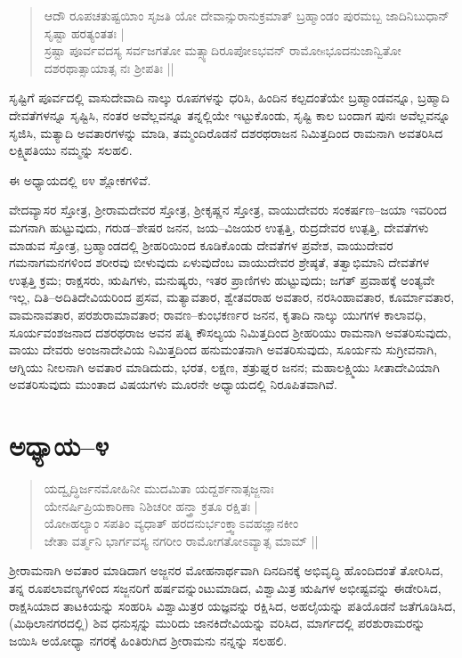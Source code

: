 \begin{verse}
ಆದೌ ರೂಪಚತುಷ್ಟಯಿಾಂ ಸೃಜತಿ ಯೋ ದೇವಾನ್ಸುರಾನುಕ್ರಮಾತ್ ಬ್ರಹ್ಮಾಂಡಂ ಪುರಮಬ್ಬ ಜಾದಿನಿಬುಧಾನ್ ಸೃಷ್ಟಾ ಹರತ್ಯಂತತಃ |\\ ಸ್ರಷ್ಟಾ ಪೂರ್ವವದಸ್ಯ ಸರ್ವಜಗತೋ ಮತ್ಸ್ಯಾದಿರೂಪೋಽಭವನ್ ರಾಮೋsಭೂದನುಜಾನ್ವಿತೋ ದಶರಥಾತ್ಸಾಯಾತ್ಸ ನಃ ಶ‍್ರೀಪತಿಃ ||
\end{verse}

ಸೃಷ್ಟಿಗೆ ಪೂರ್ವದಲ್ಲಿ ವಾಸುದೇವಾದಿ ನಾಲ್ಕು ರೂಪಗಳನ್ನು ಧರಿಸಿ, ಹಿಂದಿನ ಕಲ್ಪದಂತೆಯೇ ಬ್ರಹ್ಮಾಂಡವನ್ನೂ, ಬ್ರಹ್ಮಾದಿ ದೇವತೆಗಳನ್ನೂ ಸೃಷ್ಟಿಸಿ, ನಂತರ ಅವೆಲ್ಲವನ್ನೂ ತನ್ನಲ್ಲಿಯೇ ಇಟ್ಟುಕೊಂಡು, ಸೃಷ್ಟಿ ಕಾಲ ಬಂದಾಗ ಪುನಃ ಅವೆಲ್ಲವನ್ನೂ ಸೃಜಿಸಿ, ಮತ್ಯಾದಿ ಅವತಾರಗಳನ್ನು ಮಾಡಿ, ತಮ್ಮಂದಿರೊಡನೆ ದಶರಥರಾಜನ ನಿಮಿತ್ತದಿಂದ ರಾಮನಾಗಿ ಅವತರಿಸಿದ ಲಕ್ಷ್ಮಿಪತಿಯು ನಮ್ಮನ್ನು ಸಲಹಲಿ.

ಈ ಅಧ್ಯಾಯದಲ್ಲಿ ೮೪ ಶ್ಲೋಕಗಳಿವೆ.

ವೇದವ್ಯಾಸರ ಸ್ತೋತ್ರ, ಶ‍್ರೀರಾಮದೇವರ ಸ್ತೋತ್ರ, ಶ‍್ರೀಕೃಷ್ಣನ ಸ್ತೋತ್ರ, ವಾಯುದೇವರು ಸಂಕರ್ಷಣ–ಜಯಾ ಇವರಿಂದ ಮಗನಾಗಿ ಹುಟ್ಟುವುದು, ಗರುಡ–ಶೇಷರ ಜನನ, ಜಯ–ವಿಜಯರ ಉತ್ಪತ್ತಿ, ರುದ್ರದೇವರ ಉತ್ಪತ್ತಿ, ದೇವತೆಗಳು ಮಾಡುವ ಸ್ತೋತ್ರ, ಬ್ರಹ್ಮಾಂಡದಲ್ಲಿ ಶ‍್ರೀಹರಿಯಿಂದ ಕೂಡಿಕೊಂಡು ದೇವತೆಗಳ ಪ್ರವೇಶ, ವಾಯುದೇವರ ಗಮನಾಗಮನಗಳಿಂದ ಶರೀರವು ಬೀಳುವುದು ಏಳುವುದೆಂಬ ವಾಯುದೇವರ ಶ್ರೇಷ್ಠತೆ, ತತ್ವಾಭಿಮಾನಿ ದೇವತೆಗಳ ಉತ್ಪತ್ತಿ ಕ್ರಮ; ರಾಕ್ಷಸರು, ಋಷಿಗಳು, ಮನುಷ್ಯರು, ಇತರ ಪ್ರಾಣಿಗಳು ಹುಟ್ಟುವುದು; ಜಗತ್ ಪ್ರವಾಹಕ್ಕೆ ಅಂತ್ಯವೇ ಇಲ್ಲ, ದಿತಿ–ಅದಿತಿದೇವಿಯರಿಂದ ಪ್ರಸವ, ಮತ್ಯಾವತಾರ, ಶ್ವೇತವರಾಹ ಅವತಾರ, ನರಸಿಂಹಾವತಾರ, ಕೂರ್ಮಾವತಾರ, ವಾಮನಾವತಾರ, ಪರಶುರಾಮಾವತಾರ; ರಾವಣ–ಕುಂಭಕರ್ಣರ ಜನನ, ಕೃತಾದಿ ನಾಲ್ಕು ಯುಗಗಳ ಕಾಲಾವಧಿ, ಸೂರ್ಯವಂಶಜನಾದ ದಶರಥರಾಜ ಅವನ ಪತ್ನಿ ಕೌಸಲ್ಯಯ ನಿಮಿತ್ತದಿಂದ ಶ‍್ರೀಹರಿಯು ರಾಮನಾಗಿ ಅವತರಿಸುವುದು, ವಾಯು ದೇವರು ಅಂಜನಾದೇವಿಯ ನಿಮಿತ್ತದಿಂದ ಹನುಮಂತನಾಗಿ ಅವತರಿಸುವುದು, ಸೂರ್ಯನು ಸುಗ್ರೀವನಾಗಿ, ಆಗ್ನಿಯು ನೀಲನಾಗಿ ಅವತಾರ ಮಾಡಿದುದು, ಭರತ, ಲಕ್ಷಣ, ಶತ್ರುಘ್ನರ ಜನನ; ಮಹಾಲಕ್ಷ್ಮಿಯು ಸೀತಾದೇವಿಯಾಗಿ ಅವತರಿಸುವುದು ಮುಂತಾದ ವಿಷಯಗಳು ಮೂರನೇ ಅಧ್ಯಾಯದಲ್ಲಿ ನಿರೂಪಿತವಾಗಿವೆ.


\section{ಅಧ್ಯಾಯ–೪}

\begin{verse}
ಯದ್ವೃದ್ಧಿರ್ಜನಮೋಹಿನೀ ಮುದಮಿತಾ ಯದ್ದರ್ಶನಾತ್ಸಜ್ಜನಾಃ\\ ಯೇನರ್ಷಿಪ್ರಿಯಕಾರಿಣಾ ನಿಶಿಚರೀ ಹನ್ತ್ರಾ ಕ್ರತೂ ರಕ್ಷಿತಃ |\\ ಯೋsಹಲ್ಯಾಂ ಸಪತಿಂ ವ್ಯಧಾತ್‌ ಹರದನುರ್ಭಂಕ್ತ್ವಾಽವಹಜ್ಞಾನಕೀಂ\\ ಜೇತಾ ವರ್ತ್ಮನಿ ಭಾರ್ಗವಸ್ಯ ನಗರೀಂ ರಾಮೋಗತೋಽವ್ಯಾತ್ಸ ಮಾಮ್ ||
\end{verse}

ಶ‍್ರೀರಾಮನಾಗಿ ಅವತಾರ ಮಾಡಿದಾಗ ಅಜ್ಜನರ ಮೋಹನಾರ್ಥವಾಗಿ ದಿನದಿನಕ್ಕೆ ಅಭಿವೃದ್ಧಿ ಹೊಂದಿದಂತೆ ತೋರಿಸಿದ, ತನ್ನ ರೂಪಲಾವಣ್ಯಗಳಿಂದ ಸಜ್ಜನರಿಗೆ ಹರ್ಷವನ್ನುಂಟುಮಾಡಿದ, ವಿಶ್ವಾಮಿತ್ರ ಋಷಿಗಳ ಅಭೀಷ್ಟವನ್ನು ಈಡೇರಿಸಿದ, ರಾಕ್ಷಸಿಯಾದ ತಾಟಕಿಯನ್ನು ಸಂಹರಿಸಿ ವಿಶ್ವಾಮಿತ್ರರ ಯಜ್ಞವನ್ನು ರಕ್ಷಿಸಿದ, ಅಹಲೈಯನ್ನು ಪತಿಯೊಡನೆ ಜತೆಗೂಡಿಸಿದ, (ಮಿಥಿಲಾನಗರದಲ್ಲಿ) ಶಿವ ಧನುಸ್ಸನ್ನು ಮುರಿದು ಜಾನಕಿದೇವಿಯನ್ನು ವರಿಸಿದ, ಮಾರ್ಗದಲ್ಲಿ ಪರಶುರಾಮರನ್ನು ಜಯಿಸಿ ಅಯೋಧ್ಯಾ ನಗರಕ್ಕೆ ಹಿಂತಿರುಗಿದ ಶ‍್ರೀರಾಮನು ನನ್ನನ್ನು ಸಲಹಲಿ.

